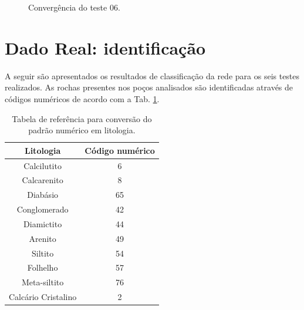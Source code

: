 \begin{figure}[H]
	\centering
	\setlength{\fboxsep}{8pt}
	\setlength{\fboxrule}{0.1pt}
	\caption{Convergência do teste $06$.}
	\label{Conv06}
\end{figure} 

\section{Dado Real: identificação}

A seguir são apresentados os resultados de classificação da rede para os seis testes realizados. As rochas presentes nos poços analisados são identificadas através de códigos numéricos de acordo com a Tab. \ref{codigosreal}. 

\begin{table}[H]
	\centering
	\begin{tabular}{c|c}
		
		Litologia                    & Código numérico \\ %
		\hline                                                             %
		Calcilutito                   &  6              \\
		Calcarenito  		          &  8              \\
		Diabásio    	              &  65              \\
		Conglomerado                  &  42              \\
		Diamictito                    &  44              \\
		Arenito                       &  49              \\
		Siltito                       &  54              \\
		Folhelho                      &  57              \\
		Meta-siltito                  &  76              \\
		Calcário Cristalino           &  2              \\
		
	\end{tabular}
	\label{codigosreal}
	\caption{Tabela de referência para conversão do padrão numérico em litologia.}
\end{table}


